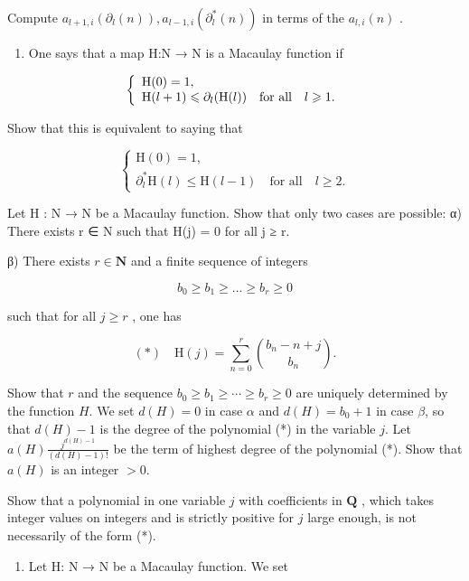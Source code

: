 Compute \(a_{l+1,i}(\partial_l(n)), a_{l-1,i}(\partial_l^*(n))\) in terms of the \(a_{l,i}(n)\) .

\begin{enumerate}
\def\labelenumi{\alph{enumi})}
\setcounter{enumi}{1}
\tightlist
\item
  One says that a map H:N → N is a Macaulay function if
\end{enumerate}

\[
\left\{ \begin{array}{l l} \mathrm{H} (0) = 1, \\ \mathrm{H} (l + 1) \leqslant \partial_ {l} (\mathrm{H} (l)) & \text {for all} \quad l \geqslant 1. \end{array} \right.
\]

Show that this is equivalent to saying that

\[
\left\{ \begin{array}{l} \mathrm{H} (0) = 1, \\ \partial_ {l} ^ {*} \mathrm{H} (l) \leqslant \mathrm{H} (l - 1) \quad \text {for all} \quad l \geqslant 2. \end{array} \right.
\]

Let H : N → N be a Macaulay function. Show that only two cases are possible: α) There exists r ∈ N such that H(j) = 0 for all j ≥ r.

β) There exists \(r \in \mathbf{N}\) and a finite sequence of integers

\[
b _ {0} \geqslant b _ {1} \geqslant \dots \geqslant b _ {r} \geqslant 0
\]

such that for all \(j \geqslant r\) , one has

\[
(*) \quad \mathrm{H} (j) = \sum_ {n = 0} ^ {r} \binom {b _ {n} - n + j} {b _ {n}}.
\]

Show that \(r\) and the sequence \(b_0 \geqslant b_1 \geqslant \cdots \geqslant b_r \geqslant 0\) are uniquely determined by the function \(H\). We set \(d(H) = 0\) in case \(\alpha\) and \(d(H) = b_0 + 1\) in case \(\beta\), so that \(d(H) - 1\) is the degree of the polynomial (*) in the variable \(j\). Let \(a(H) \frac{j^{d(H)-1}}{(d(H) - 1)!}\) be the term of highest degree of the polynomial (*). Show that \(a(H)\) is an integer \(> 0\).

Show that a polynomial in one variable \(j\) with coefficients in \(\mathbf{Q}\) , which takes integer values on integers and is strictly positive for \(j\) large enough, is not necessarily of the form (*).

\begin{enumerate}
\def\labelenumi{\alph{enumi})}
\setcounter{enumi}{2}
\tightlist
\item
  Let H: N → N be a Macaulay function. We set
\end{enumerate}

